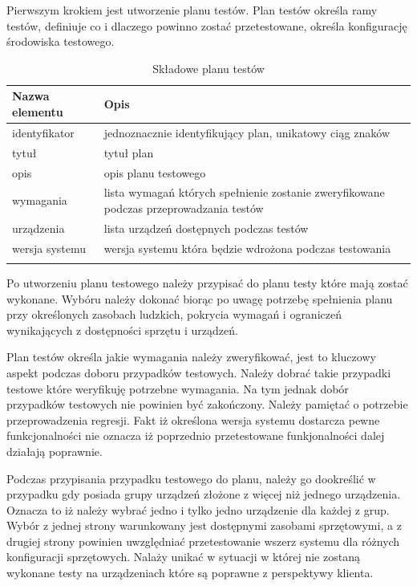 Pierwszym krokiem jest utworzenie planu testów. Plan testów określa ramy testów, definiuje co i dlaczego powinno zostać przetestowane, określa konfigurację środowiska testowego.

\begin{longtable}{| p{6cm}  | p{10cm} |}
 \hline \hline
\textbf{Nazwa elementu} & \textbf{Opis}  \\ \hline
  identyfikator & jednoznacznie identyfikujący plan, unikatowy ciąg znaków \\ \hline
  tytuł & tytuł plan \\ \hline
  opis & opis planu testowego \\ \hline
  wymagania & lista wymagań których spełnienie zostanie zweryfikowane podczas przeprowadzania testów \\ \hline
  urządzenia & lista urządzeń dostępnych podczas testów \\ \hline
  wersja systemu & wersja systemu która będzie wdrożona podczas testowania  \\ \hline
 \caption{ Składowe planu testów}
\end{longtable}

Po utworzeniu planu testowego należy przypisać do planu testy które mają zostać wykonane. Wybóru należy dokonać biorąc po uwagę potrzebę spełnienia planu przy określonych zasobach ludzkich, pokrycia wymagań i ograniczeń wynikających z dostępności sprzętu i urządzeń.

Plan testów określa jakie wymagania należy zweryfikować, jest to kluczowy aspekt podczas doboru przypadków testowych. Należy dobrać takie przypadki testowe które weryfikuję potrzebne wymagania. Na tym jednak dobór przypadków testowych nie powinien być zakończony. Należy pamiętać o potrzebie przeprowadzenia regresji. Fakt iż określona wersja systemu dostarcza pewne funkcjonalności nie oznacza iż poprzednio przetestowane funkjonalności dalej działają poprawnie.

Podczas przypisania przypadku testowego do planu, należy go dookreślić w przypadku gdy posiada grupy urządzeń złożone z więcej niż jednego urządzenia. Oznacza to iż należy wybrać jedno i tylko jedno urządzenie dla każdej z grup. Wybór z jednej strony warunkowany jest dostępnymi zasobami sprzętowymi, a z drugiej strony powinien uwzględniać przetestowanie wszerz systemu dla różnych konfiguracji sprzętowych. Nalaży unikać w sytuacji w której nie zostaną wykonane testy na urządzeniach które są poprawne z perspektywy klienta.

